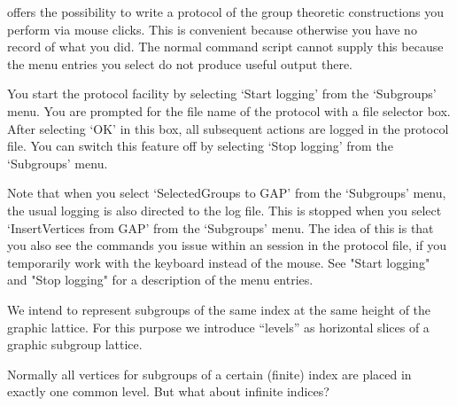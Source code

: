 





\label{loggingfacility}
{\XGAP} offers the possibility to write a protocol of the group
theoretic constructions you perform via mouse clicks. This is
convenient because otherwise you have no record of what you did. The
normal {\GAP} command script cannot supply this because the menu
entries you select do not produce useful output there.

You start the protocol facility by selecting `Start logging' from the
`Subgroups' menu. You are prompted for the file name of the protocol with 
a file selector box. After selecting `OK' in this box, all subsequent
actions are logged in the protocol file. You can switch this feature
off by selecting `Stop logging' from the `Subgroups' menu.

Note that when you select `SelectedGroups to GAP' from the `Subgroups' 
menu, the usual {\GAP} logging is also directed to the {\XGAP} log
  file. This is stopped when you select `InsertVertices from GAP' from 
  the `Subgroups' menu. The idea of this is that you also see the
  {\GAP} commands you issue within an {\XGAP} session in the {\XGAP}
  protocol file, if you temporarily work with the keyboard instead of
  the mouse. See "Start logging" and "Stop logging" for a description
  of the menu entries.



\label{levelsintro}
We intend to represent subgroups of the same index at the same height
of the graphic lattice. For this purpose we introduce ``levels'' as 
horizontal slices of a graphic subgroup lattice. 

Normally all vertices for subgroups of a certain (finite) index are
placed in exactly one common level. But what about infinite indices?

